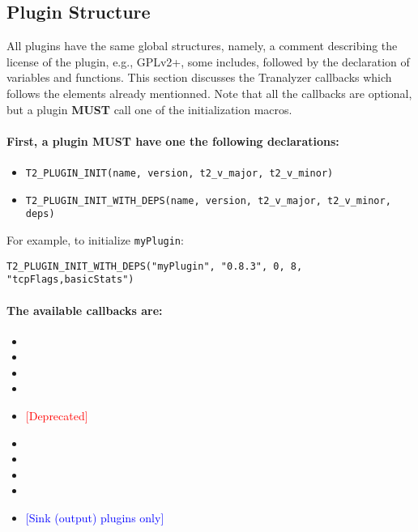 \documentclass[documentation]{subfiles}
\begin{document}

\subsection{Plugin Structure}

All plugins have the same global structures, namely, a comment describing the license of the plugin, e.g., GPLv2+, some includes, followed by the declaration of variables and functions.
This section discusses the Tranalyzer callbacks which follows the elements already mentionned.
Note that all the callbacks are optional, but a plugin {\bf MUST} call one of the initialization macros.

\paragraph{First, a plugin {\bf MUST} have one the following declarations:}
\begin{itemize}
    \item {\tt T2\_PLUGIN\_INIT(name, version, t2\_v\_major, t2\_v\_minor)}
    \item {\tt T2\_PLUGIN\_INIT\_WITH\_DEPS(name, version, t2\_v\_major, t2\_v\_minor, deps)}
\end{itemize}
For example, to initialize {\tt myPlugin}:
\begin{center}
{\tt T2\_PLUGIN\_INIT\_WITH\_DEPS("myPlugin", "0.8.3", 0, 8, "tcpFlags,basicStats")}
\end{center}

\paragraph{The available callbacks are:}
\begin{itemize}
    \item {\tt{}}
    \item {\tt{}}
    \item {\tt{}}
    \item {\tt{}}
    \item {\tt{}} \textcolor{red}{[Deprecated]}
    \item {\tt{}}
    \item {\tt{}}
    \item {\tt{}}
    \item {\tt{}}
    \item {\tt{}} \textcolor{blue}{[Sink (output) plugins only]}
\end{itemize}
\end{document}
